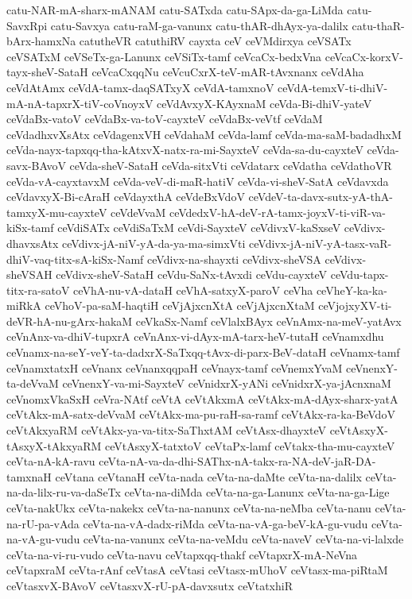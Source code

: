 {catu-NAR-mA-sharx-mANAM
catu-SATxda
catu-SApx-da-ga-LiMda
catu-SavxRpi
catu-Savxya
catu-raM-ga-vanunx
catu-thAR-dhAyx-ya-dalilx
catu-thaR-bArx-hamxNa
catutheVR
catuthiRV
cayxta
ceV
ceVMdirxya
ceVSATx
ceVSATxM
ceVSeTx-ga-Lanunx
ceVSiTx-tamf
ceVcaCx-bedxVna
ceVcaCx-korxV-tayx-sheV-SataH
ceVcaCxqqNu
ceVcuCxrX-teV-mAR-tAvxnanx
ceVdAha
ceVdAtAmx
ceVdA-tamx-daqSATxyX
ceVdA-tamxnoV
ceVdA-temxV-ti-dhiV-mA-nA-tapxrX-tiV-coVnoyxV
ceVdAvxyX-KAyxnaM
ceVda-Bi-dhiV-yateV
ceVdaBx-vatoV
ceVdaBx-va-toV-cayxteV
ceVdaBx-veVtf
ceVdaM
ceVdadhxvXsAtx
ceVdagenxVH
ceVdahaM
ceVda-lamf
ceVda-ma-saM-badadhxM
ceVda-nayx-tapxqq-tha-kAtxvX-natx-ra-mi-SayxteV
ceVda-sa-du-cayxteV
ceVda-savx-BAvoV
ceVda-sheV-SataH
ceVda-sitxVti
ceVdatarx
ceVdatha
ceVdathoVR
ceVda-vA-cayxtavxM
ceVda-veV-di-maR-hatiV
ceVda-vi-sheV-SatA
ceVdavxda
ceVdavxyX-Bi-cAraH
ceVdayxthA
ceVdeBxVdoV
ceVdeV-ta-davx-sutx-yA-thA-tamxyX-mu-cayxteV
ceVdeVvaM
ceVdedxV-hA-deV-rA-tamx-joyxV-ti-viR-va-kiSx-tamf
ceVdiSATx
ceVdiSaTxM
ceVdi-SayxteV
ceVdivxV-kaSxseV
ceVdivx-dhavxsAtx
ceVdivx-jA-niV-yA-da-ya-ma-simxVti
ceVdivx-jA-niV-yA-tasx-vaR-dhiV-vaq-titx-sA-kiSx-Namf
ceVdivx-na-shayxti
ceVdivx-sheVSA
ceVdivx-sheVSAH
ceVdivx-sheV-SataH
ceVdu-SaNx-tAvxdi
ceVdu-cayxteV
ceVdu-tapx-titx-ra-satoV
ceVhA-nu-vA-dataH
ceVhA-satxyX-paroV
ceVha
ceVheY-ka-ka-miRkA
ceVhoV-pa-saM-haqtiH
ceVjAjxcnXtA
ceVjAjxcnXtaM
ceVjojxyXV-ti-deVR-hA-nu-gArx-hakaM
ceVkaSx-Namf
ceVlalxBAyx
ceVnAmx-na-meV-yatAvx
ceVnAnx-va-dhiV-tupxrA
ceVnAnx-vi-dAyx-mA-tarx-heV-tutaH
ceVnamxdhu
ceVnamx-na-seY-veY-ta-dadxrX-SaTxqq-tAvx-di-parx-BeV-dataH
ceVnamx-tamf
ceVnamxtatxH
ceVnanx
ceVnanxqqpaH
ceVnayx-tamf
ceVnemxYvaM
ceVnenxY-ta-deVvaM
ceVnenxY-va-mi-SayxteV
ceVnidxrX-yANi
ceVnidxrX-ya-jAcnxnaM
ceVnomxVkaSxH
ceVra-NAtf
ceVtA
ceVtAkxmA
ceVtAkx-mA-dAyx-sharx-yatA
ceVtAkx-mA-satx-deVvaM
ceVtAkx-ma-pu-raH-sa-ramf
ceVtAkx-ra-ka-BeVdoV
ceVtAkxyaRM
ceVtAkx-ya-va-titx-SaThxtAM
ceVtAsx-dhayxteV
ceVtAsxyX-tAsxyX-tAkxyaRM
ceVtAsxyX-tatxtoV
ceVtaPx-lamf
ceVtakx-tha-mu-cayxteV
ceVta-nA-kA-ravu
ceVta-nA-va-da-dhi-SAThx-nA-takx-ra-NA-deV-jaR-DA-tamxnaH
ceVtana
ceVtanaH
ceVta-nada
ceVta-na-daMte
ceVta-na-dalilx
ceVta-na-da-lilx-ru-va-daSeTx
ceVta-na-diMda
ceVta-na-ga-Lanunx
ceVta-na-ga-Lige
ceVta-nakUkx
ceVta-nakekx
ceVta-na-nanunx
ceVta-na-neMba
ceVta-nanu
ceVta-na-rU-pa-vAda
ceVta-na-vA-dadx-riMda
ceVta-na-vA-ga-beV-kA-gu-vudu
ceVta-na-vA-gu-vudu
ceVta-na-vanunx
ceVta-na-veMdu
ceVta-naveV
ceVta-na-vi-lalxde
ceVta-na-vi-ru-vudo
ceVta-navu
ceVtapxqq-thakf
ceVtapxrX-mA-NeVna
ceVtapxraM
ceVta-rAnf
ceVtasA
ceVtasi
ceVtasx-mUhoV
ceVtasx-ma-piRtaM
ceVtasxvX-BAvoV
ceVtasxvX-rU-pA-davxsutx
ceVtatxhiR
}
